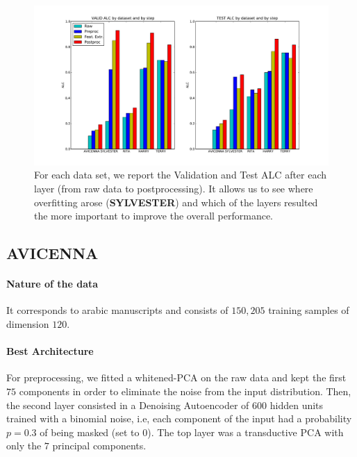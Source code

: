 \begin{figure}[t]
  \begin{center}
    \includegraphics[width=1.\linewidth]{article1/images/5steps.pdf}
    \caption[ALC after each layer on Valid and Test]{\label{fig:charts} For each data set, we report the Validation and Test ALC after each layer (from raw data to postprocessing). It allows us to see where overfitting arose ({\bf SYLVESTER}) and which of the layers resulted the more important to improve the overall performance.}
    \vspace{-0.2in}
  \end{center}
 \vspace*{-1mm}
\end{figure}


 
\subsection{AVICENNA}

\paragraph{Nature of the data}
It corresponds to arabic manuscripts and consists of $150,205$ training samples of dimension $120$.

\paragraph{Best Architecture}
For preprocessing, we fitted a whitened-PCA on the raw data and kept the first
$75$ components in order to eliminate the noise from the input distribution.
Then, the second layer consisted in a Denoising Autoencoder of $600$ hidden
units trained with a binomial noise, i.e, each component of the input had a
probability $p=0.3$ of being masked (set to 0). The top layer was a transductive PCA 
with only the $7$ principal components.

